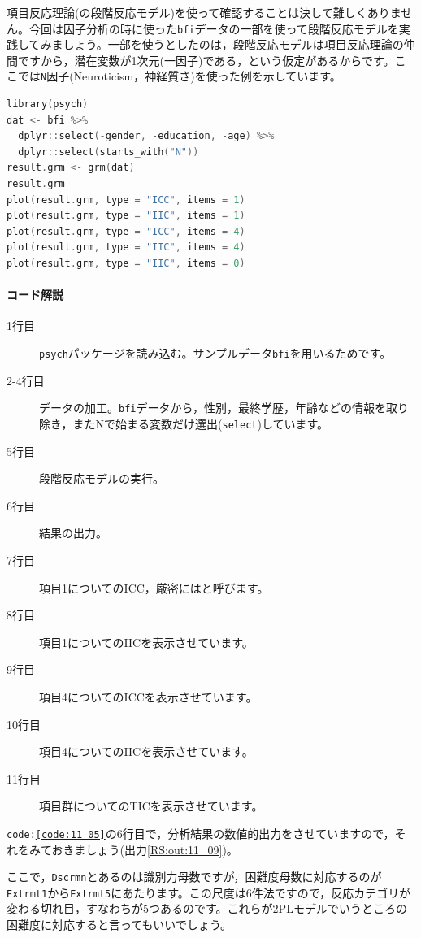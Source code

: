 \documentclass{ltjsbook}
\begin{document}
項目反応理論(の段階反応モデル)を使って確認することは決して難しくありません。今回は因子分析の時に使った\texttt{bfi}データの一部を使って段階反応モデルを実践してみましょう。一部を使うとしたのは，段階反応モデルは項目反応理論の仲間ですから，潜在変数が1次元(一因子)である，という仮定があるからです。ここでは\texttt{N}因子(Neuroticism，神経質さ)を使った例を示しています。

\begin{lstlisting}[language=c++,label={code:11_05},caption={GRMの実行}]
library(psych)
dat <- bfi %>%
  dplyr::select(-gender, -education, -age) %>%
  dplyr::select(starts_with("N"))
result.grm <- grm(dat)
result.grm
plot(result.grm, type = "ICC", items = 1)
plot(result.grm, type = "IIC", items = 1)
plot(result.grm, type = "ICC", items = 4)
plot(result.grm, type = "IIC", items = 4)
plot(result.grm, type = "IIC", items = 0)
\end{lstlisting}

\paragraph{コード解説}
\begin{description}
	\item[1行目] \texttt{psych}パッケージを読み込む。サンプルデータ\texttt{bfi}を用いるためです。
	\item[2-4行目] データの加工。\texttt{bfi}データから，性別，最終学歴，年齢などの情報を取り除き，またNで始まる変数だけ選出(\texttt{select})しています。
	\item[5行目] 段階反応モデルの実行。
	\item[6行目] 結果の出力。
	\item[7行目] 項目1についてのICC，厳密にはと呼びます。
	\item[8行目] 項目1についてのIICを表示させています。
	\item[9行目] 項目4についてのICCを表示させています。
	\item[10行目] 項目4についてのIICを表示させています。
	\item[11行目]項目群についてのTICを表示させています。
\end{description}

\texttt{code:\ref{code:11_05}}の6行目で，分析結果の数値的出力をさせていますので，それをみておきましょう(出力\ref{RS:out:11_09})。

ここで，\texttt{Dscrmn}とあるのは識別力母数ですが，困難度母数に対応するのが\texttt{Extrmt1}から\texttt{Extrmt5}にあたります。この尺度は6件法ですので，反応カテゴリが変わる切れ目，すなわちが5つあるのです。これらが2PLモデルでいうところの困難度に対応すると言ってもいいでしょう。
\end{document}
